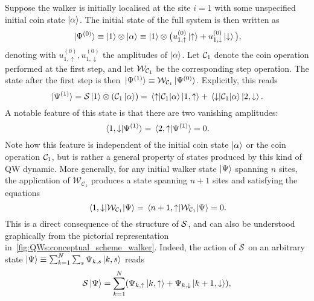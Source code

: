 Suppose the walker is initially localised at the site $i=1$ with some unspecified initial coin state $\ket\alpha$.
The initial state of the full system is then written as
\begin{equation}
    \ket*{\Psi^{(0)}} \equiv
    \ket1\otimes\ket\alpha \equiv
    \ket{1}\otimes \big(u^{(0)}_{1,\uparrow} \ket{\uparrow} +
    u^{(0)}_{1,\downarrow} \ket{\downarrow} \big),
\end{equation}
denoting with $u^{(0)}_{1,\uparrow},u^{(0)}_{1,\downarrow}$ the amplitudes of $\ket\alpha$.
Let ${\mathcal{C}}_1$ denote the coin operation performed at the first step,
and let ${\mathcal{W}}_{{\mathcal{C}}_1}$ be the corresponding step operation.
The state after the first step is then
$\ket*{\Psi^{(1)}} \equiv {\mathcal{W}}_{{\mathcal{C}}_1} \ket*{\Psi^{(0)}}$.
Explicitly, this reads
\begin{equation}
    \ket*{\Psi^{(1)}} =
    {\mathcal{S}} \ket1\otimes({\mathcal{C}}_1\ket\alpha) =
    \mel{\uparrow}{{\mathcal{C}}_1}{\alpha} \ket{1,\uparrow} +
    \mel{\downarrow}{{\mathcal{C}}_1}{\alpha} \ket{2,\downarrow}.
\end{equation}
A notable feature of this state is that there are two vanishing amplitudes:
\begin{equation}
    \braket*{1, \downarrow}{\Psi^{(1)}} = \braket*{2, \uparrow}{\Psi^{(1)}} = 0.
\end{equation}
Note how this feature is independent of the initial coin state $\ket\alpha$ or the coin operation ${\mathcal{C}}_1$, but is rather a general property of states produced by this kind of \ac{QW} dynamic.
More generally, for any initial walker state $\ket{\Psi}$ spanning $n$ sites, the application of $\mathcal W_{\mathcal C_1}$ produces a state spanning $n+1$ sites and satisfying the equations
\begin{equation}
	\mel{1, \downarrow}{\mathcal W_{\mathcal C_1}}{\Psi} =
	\mel{n+1, \uparrow}{\mathcal W_{\mathcal C_1}}{\Psi} = 0.
	\label{eq:QWs:vanishing_endpoints}
\end{equation}
This is a direct consequence of the structure of ${\mathcal{S}}$, and can also be understood graphically from the pictorial representation in~\cref{fig:QWs:conceptual_scheme_walker}.
Indeed, the action of ${\mathcal{S}}$ on an arbitrary state
$\ket\Psi\equiv\sum_{k=1}^N \sum_s \Psi_{k,s}\ket{k,s}$ reads
\begin{equation}
    {\mathcal{S}}\ket\Psi =
    \sum_{k=1}^N (\Psi_{k,\uparrow}\ket{k,\uparrow} + \Psi_{k,\downarrow}\ket{k+1,\downarrow}),
\end{equation}
